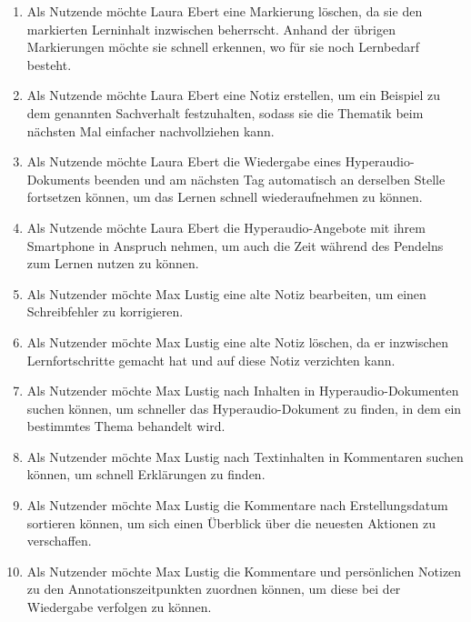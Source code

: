 \begin{enumerate}[label=US-\arabic*:,ref=US-\arabic*]
\item \label{US-Markierung-Loeschen} Als Nutzende möchte Laura Ebert eine Markierung löschen, da sie den markierten Lerninhalt inzwischen beherrscht. Anhand der übrigen Markierungen möchte sie schnell erkennen, wo für sie noch Lernbedarf besteht.

\item \label{US-Notiz-S} Als Nutzende möchte Laura Ebert eine Notiz erstellen, um ein Beispiel zu dem genannten Sachverhalt festzuhalten, sodass sie die Thematik beim nächsten Mal einfacher nachvollziehen kann.

\item \label{US-Fortsetzen} Als Nutzende möchte Laura Ebert die Wiedergabe eines Hyperaudio-Dokuments beenden und am nächsten Tag automatisch an derselben Stelle fortsetzen können, um das Lernen schnell wiederaufnehmen zu können.

\item \label{US-Mobil} Als Nutzende möchte Laura Ebert die Hyperaudio-Angebote mit ihrem Smartphone in Anspruch nehmen, um auch die Zeit während des Pendelns zum Lernen nutzen zu können.

\item \label{US-Notiz-Bearbeiten} Als Nutzender möchte Max Lustig eine alte Notiz bearbeiten, um einen Schreibfehler zu korrigieren.

\item \label{US-Notiz-Loeschen} Als Nutzender möchte Max Lustig eine alte Notiz löschen, da er inzwischen Lernfortschritte gemacht hat und auf diese Notiz verzichten kann.

\item \label{US-Galerie} Als Nutzender möchte Max Lustig nach Inhalten in Hyperaudio-Dokumenten suchen können, um schneller das Hyperaudio-Dokument zu finden, in dem ein bestimmtes Thema behandelt wird.

\item \label{US-Suche} Als Nutzender möchte Max Lustig nach Textinhalten in Kommentaren suchen können, um schnell Erklärungen zu finden.

\item \label{US-Sortierung-Erstellungsdatum} Als Nutzender möchte Max Lustig die Kommentare nach Erstellungsdatum sortieren können, um sich einen Überblick über die neuesten Aktionen zu verschaffen.

\item \label{US-Sortierung-Zeitpunkt} Als Nutzender möchte Max Lustig die Kommentare und persönlichen Notizen zu den Annotationszeitpunkten zuordnen können, um diese bei der Wiedergabe verfolgen zu können.


\end{enumerate}
